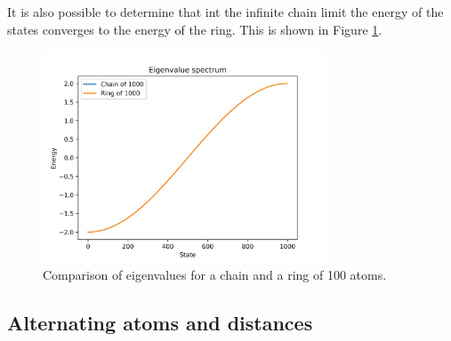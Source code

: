 \documentclass{article}
\begin{document}
It is also possible to determine that int the infinite chain limit the energy of the states converges to the energy of the ring. This is shown in Figure \ref{fig:chain_vs_ring_infinite}.

\begin{figure}[h]
    \centering
    \includegraphics[width=0.75\textwidth]{Figures/convergence_limit.jpg}
    \caption{Comparison of eigenvalues for a chain and a ring of 100 atoms.}
    \label{fig:chain_vs_ring_infinite}
\end{figure}

\subsection{Alternating atoms and distances}
\end{document}
